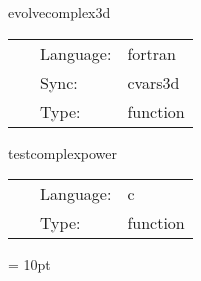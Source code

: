 \vspace{5mm}


\hspace{5mm} evolvecomplex3d 

\hspace{5mm}{\it evolve 3d complex grid functions } 


\hspace{5mm}

 \begin{tabular*}{160mm}{cll} 
~ & Language:  & fortran \\ 
~ & Sync:  & cvars3d \\ 
~ & Type:  & function \\ 
\end{tabular*} 


\vspace{5mm}


\hspace{5mm} testcomplexpower 

\hspace{5mm}{\it do a simple complex power operation } 


\hspace{5mm}

 \begin{tabular*}{160mm}{cll} 
~ & Language:  & c \\ 
~ & Type:  & function \\ 
\end{tabular*} 



\vspace{5mm}\parskip = 10pt 
